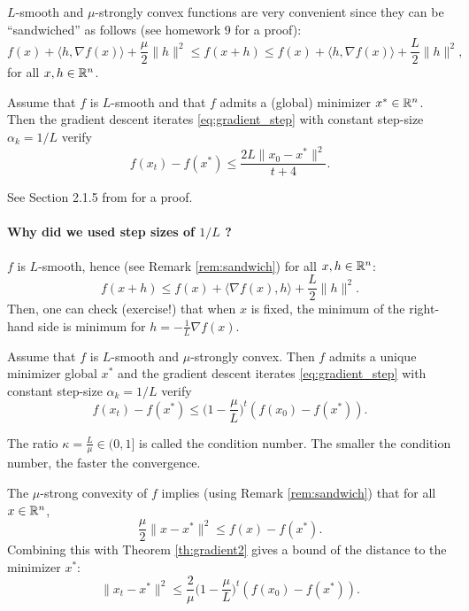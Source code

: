 \documentclass[11pt,nocut]{article}
\begin{document}
\begin{remark}\label{rem:sandwich}
	$L$-smooth and $\mu$-strongly convex functions are very convenient since they can be ``sandwiched'' as follows (see homework 9 for a proof):
	$$
	f(x) + \langle h ,\nabla f(x) \rangle + \frac{\mu}{2} \|h\|^2 
	\leq f(x+h) \leq
	f(x) + \langle h ,\nabla f(x) \rangle + \frac{L}{2} \|h\|^2,
	$$
	for all $x,h \in\mathbb{R}^n$.
\end{remark}

\begin{theorem}\label{th:gradient1}
	Assume that $f$ is $L$-smooth and that $f$ admits a (global) minimizer $x^* \in \mathbb{R}^n$. Then
	the gradient descent iterates \eqref{eq:gradient_step} with constant step-size $\alpha_k = 1/L$ verify
	$$
	f(x_t) - f(x^*) \leq \frac{2 L \| x_0 - x^* \|^2}{t+4}.
	$$
\end{theorem}
See Section 2.1.5 from \cite{nesterov2018lectures} for a proof.

\paragraph{Why did we used step sizes of $1/L$ ?} $f$ is $L$-smooth, hence (see Remark \ref{rem:sandwich}) for all $x,h \in \mathbb{R}^n$:
\begin{equation}\label{eq:upperL}
f(x+h) \leq f(x) + \langle \nabla f(x) , h \rangle + \frac{L}{2} \|h\|^2.
\end{equation}
Then, one can check (exercise!) that when $x$ is fixed, the minimum of the right-hand side is minimum for $h = - \frac{1}{L} \nabla f(x)$.

\begin{theorem}\label{th:gradient2}
	Assume that $f$ is $L$-smooth and $\mu$-strongly convex. 
	Then $f$ admits a unique minimizer global $x^*$ and
	the gradient descent iterates \eqref{eq:gradient_step} with constant step-size $\alpha_k = 1/L$ verify
	$$
	f(x_t) - f(x^*) \leq \Big(1-\frac{\mu}{L}\Big)^t (f(x_0) - f(x^*)).
	$$
\end{theorem}
\begin{remark}
	The ratio $\kappa = \frac{L}{\mu} \in (0,1]$ is called the condition number. The smaller the condition number, the faster the convergence.
\end{remark}
\begin{remark}
	The $\mu$-strong convexity of $f$ implies (using Remark \ref{rem:sandwich}) that for all $x \in \mathbb{R}^n$,
	$$
	\frac{\mu}{2} \|x - x^* \|^2 \leq f(x)-f(x^*).
	$$
	Combining this with Theorem \ref{th:gradient2} gives a bound of the distance to the minimizer $x^*$:
	$$
	\|x_t - x^* \|^2 \leq \frac{2}{\mu}\Big(1-\frac{\mu}{L}\Big)^{\! t} (f(x_0) - f(x^*)).
	$$
\end{remark}
\end{document}
